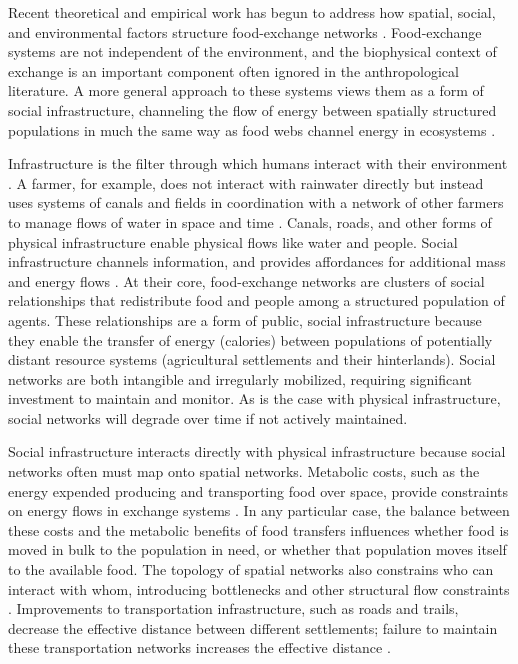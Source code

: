 \documentclass[fleqn,10pt]{wlscirep}
\begin{document}
Recent theoretical and empirical work has begun to address how spatial, social, and environmental factors structure food-exchange networks \cite{Nolin2010Food-SharingIndonesia,Koster2014,Hao2015,Schnegg2015}. Food-exchange systems are not independent of the environment, and the biophysical context of exchange is an important component often ignored in the anthropological literature. A more general approach to these systems views them as a form of social infrastructure, channeling the flow of energy between spatially structured populations in much the same way as food webs channel energy in ecosystems \cite{Crabtree2015,Crabtree2017ReconstructingStates}.


Infrastructure is the filter through which humans interact with their environment \cite{Anderies2015}. A farmer, for example, does not interact with rainwater directly but instead uses systems of canals and fields in coordination with a network of other farmers to manage flows of water in space and time \cite{Yu2015}. Canals, roads, and other forms of physical infrastructure enable physical flows like water and people. Social infrastructure channels information, and provides affordances for additional mass and energy flows \cite{Anderies2015}. At their core, food-exchange networks are clusters of social relationships that redistribute food and people among a structured population of agents. These relationships are a form of public, social infrastructure because they enable the transfer of energy (calories) between populations of potentially distant resource systems (agricultural settlements and their hinterlands). Social networks are both intangible and irregularly mobilized, requiring significant investment to maintain and monitor. As is the case with physical infrastructure, social networks will degrade over time if not actively maintained.

Social infrastructure interacts directly with physical infrastructure because social networks often must map onto spatial networks. Metabolic costs, such as the energy expended producing and transporting food over space, provide constraints on energy flows in exchange systems \cite{Drennan1984}. In any particular case, the balance between these costs and the metabolic benefits of food transfers influences whether food is moved in bulk to the population in need, or whether that population moves itself to the available food. The topology of spatial networks also constrains who can interact with whom, introducing bottlenecks and other structural flow constraints \cite{Barthelemy2011SpatialNetworks}. Improvements to transportation infrastructure, such as roads and trails, decrease the effective distance between different settlements; failure to maintain these transportation networks increases the effective distance \cite{McCall1985TheAfrica}.
\end{document}
